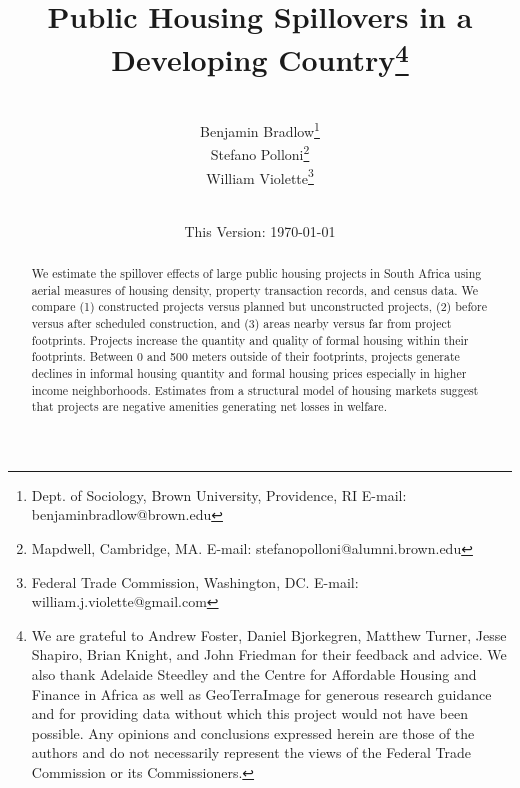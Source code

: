 \documentclass[12pt]{article}
\begin{document}
\begin{titlepage} 
\title{{Public Housing Spillovers in a Developing Country}\thanks{We are grateful to Andrew Foster, Daniel Bjorkegren, Matthew Turner, Jesse Shapiro, Brian Knight, and John Friedman for their feedback and advice.  We also thank Adelaide Steedley and the Centre for Affordable Housing and Finance in Africa as well as GeoTerraImage for generous research guidance and for providing data without which this project would not have been possible.  Any opinions and conclusions expressed herein are those of the authors and do not necessarily represent the views of the Federal Trade Commission or its Commissioners.}}
\author{\\[3em] Benjamin Bradlow\thanks{Dept. of Sociology, Brown University, Providence, RI  E-mail: benjamin\textunderscore bradlow@brown.edu}\\
 Stefano Polloni\thanks{Mapdwell, Cambridge, MA.  E-mail: stefano\textunderscore polloni@alumni.brown.edu}\\ 
  William Violette\thanks{Federal Trade Commission, Washington, DC. E-mail: william.j.violette@gmail.com} \\
 \\ 
  }
\date{\vspace{5mm}This Version: \today}
\maketitle
\begin{abstract}




	We estimate the spillover effects of large public housing projects in South Africa using aerial measures of housing density, property transaction records, and census data.  We compare (1) constructed projects versus planned but unconstructed projects, (2) before versus after scheduled construction, and (3) areas nearby versus far from project footprints.  Projects increase the quantity and quality of formal housing within their footprints.  Between 0 and 500 meters outside of their footprints, projects generate declines in informal housing quantity and formal housing prices especially in higher income neighborhoods.  Estimates from a structural model of housing markets suggest that projects are negative amenities generating net losses in welfare.


\end{abstract}
\end{titlepage}
\end{document}
